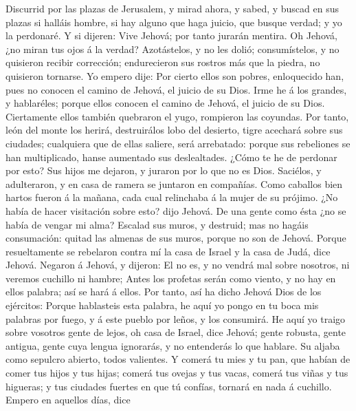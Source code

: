  Discurrid por las plazas de Jerusalem, y mirad ahora, y
sabed, y buscad en sus plazas si halláis hombre, si hay alguno que haga
juicio, que busque verdad; y yo la perdonaré.  Y si
dijeren: Vive Jehová; por tanto jurarán mentira.  Oh
Jehová, ¿no miran tus ojos á la verdad? Azotástelos, y no les dolió;
consumístelos, y no quisieron recibir corrección; endurecieron sus
rostros más que la piedra, no quisieron tornarse.  Yo
empero dije: Por cierto ellos son pobres, enloquecido han, pues no
conocen el camino de Jehová, el juicio de su Dios.  Irme
he á los grandes, y hablaréles; porque ellos conocen el camino de
Jehová, el juicio de su Dios. Ciertamente ellos también quebraron el
yugo, rompieron las coyundas.  Por tanto, león del monte
los herirá, destruirálos lobo del desierto, tigre acechará sobre sus
ciudades; cualquiera que de ellas saliere, será arrebatado: porque sus
rebeliones se han multiplicado, hanse aumentado sus deslealtades.
 ¿Cómo te he de perdonar por esto? Sus hijos me dejaron, y
juraron por lo que no es Dios. Saciélos, y adulteraron, y en casa de
ramera se juntaron en compañías.  Como caballos bien
hartos fueron á la mañana, cada cual relinchaba á la mujer de su
prójimo.  ¿No había de hacer visitación sobre esto? dijo
Jehová. De una gente como ésta ¿no se había de vengar mi alma?
 Escalad sus muros, y destruid; mas no hagáis
consumación: quitad las almenas de sus muros, porque no son de Jehová.
 Porque resueltamente se rebelaron contra mí la casa de
Israel y la casa de Judá, dice Jehová.  Negaron á Jehová,
y dijeron: El no es, y no vendrá mal sobre nosotros, ni veremos cuchillo
ni hambre;  Antes los profetas serán como viento, y no
hay en ellos palabra; así se hará á ellos.  Por tanto,
así ha dicho Jehová Dios de los ejércitos: Porque hablasteis esta
palabra, he aquí yo pongo en tu boca mis palabras por fuego, y á este
pueblo por leños, y los consumirá.  He aquí yo traigo
sobre vosotros gente de lejos, oh casa de Israel, dice Jehová; gente
robusta, gente antigua, gente cuya lengua ignorarás, y no entenderás lo
que hablare.  Su aljaba como sepulcro abierto, todos
valientes.  Y comerá tu mies y tu pan, que habían de
comer tus hijos y tus hijas; comerá tus ovejas y tus vacas, comerá tus
viñas y tus higueras; y tus ciudades fuertes en que tú confías, tornará
en nada á cuchillo.  Empero en aquellos días, dice
